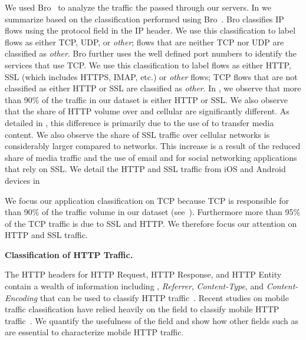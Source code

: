 We used Bro~\cite{bro} to analyze the traffic the passed through our \platname servers.
In  we summarize \mobWild based on the classification performed using Bro~\cite{bro}.
Bro classifies IP flows using the protocol field in the IP header.
We use this classification to label flows as either TCP, UDP, or \emph{other}; flows that are neither TCP nor UDP are classified as \emph{other}. 
Bro further uses the well defined port numbers to identify the services that use TCP.
We use this classification to label flows as either HTTP, SSL (which includes HTTPS, IMAP, etc.) or \emph{other} flows; TCP flows that are not classified as either HTTP or SSL are classified as \emph{other}.
In , we observe that more than 90\% of the traffic in our dataset is either HTTP or SSL. 
We also observe that the share of HTTP volume over \wifi and cellular are significantly different. 
As detailed in , this difference is primarily due to the use of \wifi to transfer media content.
We also observe the share of SSL traffic over cellular networks is considerably larger compared to \wifi networks.
This increase is a result of the reduced share of media traffic and the use of email and for social networking applications that rely on SSL.
We detail the HTTP and SSL traffic from iOS and Android devices in 

We focus our application classification on TCP because TCP is responsible for than 90\% of the traffic volume in our dataset (see~).
Furthermore more than 95\% of the TCP traffic is due to SSL and HTTP.
We therefore focus our attention on HTTP and SSL traffic. 

\textbf{Classification of HTTP Traffic.}

The HTTP headers for HTTP Request, HTTP Response, and HTTP Entity contain a wealth of information including \useragent, \emph{Referrer}, \emph{Content-Type}, and \emph{Content-Encoding} that can be used to classify HTTP traffic~\cite{rfc:http}.
Recent studies on mobile traffic classification have relied heavily on the \useragent field to classify mobile HTTP traffic~\cite{qian:webcache, maier:mobtraffic, xu:appusage}.
We quantify the usefulness of the \useragent field and show how other fields such as \httphost are essential to characterize mobile HTTP traffic. 

